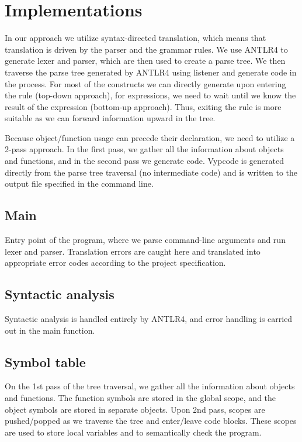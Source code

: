 \documentclass[a4paper,11pt]{article}
\begin{document}
	\section{Implementations}
		In our approach we utilize syntax-directed translation,
        which means that translation is driven by the parser and the grammar rules.
        We use ANTLR4 to generate lexer and parser, which are then used to create a parse tree.
        We then traverse the parse tree generated by ANTLR4 using listener and generate code in the process.
        For most of the constructs we can directly generate upon entering the rule (top-down approach),
        for expressions, we need to wait until we know the result of the expression (bottom-up approach).
        Thus, exiting the rule is more suitable as we can forward information upward in the tree.

        Because object/function usage can precede their declaration, we need to utilize a 2-pass approach.
        In the first pass, we gather all the information about objects and functions, and in the second pass we generate code.
        Vypcode is generated directly from the parse tree traversal (no intermediate code) and is written to the output file specified in the command line.

        \subsection{Main}
            Entry point of the program, where we parse command-line arguments and run lexer and parser.
            Translation errors are caught here and translated into appropriate error codes according to the project specification.

       \subsection{Syntactic analysis}
            Syntactic analysis is handled entirely by ANTLR4, and error handling is carried out in the main function.

        \subsection{Symbol table}
            On the 1st pass of the tree traversal, we gather all the information about objects and functions.
            The function symbols are stored in the global scope, and the object symbols are stored in separate objects.
            Upon 2nd pass, scopes are pushed/popped as we traverse the tree and enter/leave code blocks.
            These scopes are used to store local variables and to semantically check the program.
\end{document}
